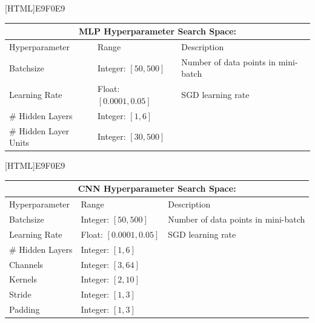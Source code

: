 \documentclass[colorinlistoftodos]{article}
\theoremstyle{definition}
\begin{document}
[HTML]{E9F0E9}{\parbox{\textwidth}{%
\small{
\begin{center}
\begin{tabular}{ |p{3cm}||p{3cm}|p{6cm}| }
 \hline
 \multicolumn{3}{|c|}{\textbf{MLP Hyperparameter Search Space:}} \\
 \hline
Hyperparameter & Range & Description\\
 \hline
 Batchsize & Integer: $[50, 500]$ & Number of data points in mini-batch\\
 Learning Rate & Float: $[0.0001, 0.05]$ & SGD learning rate\\
 \# Hidden Layers & Integer: $[1, 6]$ & \\ 
 \# Hidden Layer Units & Integer: $[30, 500]$ & \\ 
 \hline
\end{tabular}	
\end{center}
}}}

[HTML]{E9F0E9}{\parbox{\textwidth}{%
\small{
\begin{center}
\begin{tabular}{ |p{3cm}||p{3cm}|p{6cm}| }
 \hline
 \multicolumn{3}{|c|}{\textbf{CNN Hyperparameter Search Space:}} \\
 \hline
Hyperparameter & Range & Description\\
 \hline
 Batchsize & Integer: $[50, 500]$ & Number of data points in mini-batch\\
 Learning Rate & Float: $[0.0001, 0.05]$ & SGD learning rate\\
 \# Hidden Layers & Integer: $[1, 6]$ & \\ 
 Channels & Integer: $[3, 64]$ & \\
 Kernels & Integer: $[2, 10]$ & \\
 Stride & Integer: $[1, 3]$ & \\
 Padding & Integer: $[1, 3]$ & \\
 \hline
\end{tabular}	
\end{center}
}}}
\end{document}
